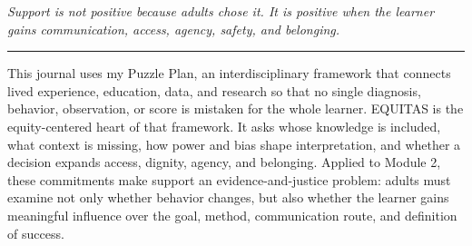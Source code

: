 \documentclass[11pt]{article}
\begin{document}
\begin{titlepage}
\vfill

\begin{center}
\begin{minipage}{0.92\textwidth}
\centering\itshape
Support is not positive because adults chose it. It is positive when the learner gains communication, access, agency, safety, and belonging.\\
{\color{PrimaryRed}\rule{4.4in}{0.8pt}}
\end{minipage}
\end{center}

\vfill

\begin{center}
\begin{minipage}{0.95\textwidth}
\small
This journal uses my Puzzle Plan, an interdisciplinary framework that connects lived experience, education, data, and research so that no single diagnosis, behavior, observation, or score is mistaken for the whole learner. EQUITAS is the equity-centered heart of that framework. It asks whose knowledge is included, what context is missing, how power and bias shape interpretation, and whether a decision expands access, dignity, agency, and belonging. Applied to Module 2, these commitments make support an evidence-and-justice problem: adults must examine not only whether behavior changes, but also whether the learner gains meaningful influence over the goal, method, communication route, and definition of success.
\end{minipage}
\end{center}

\restoregeometry
\end{titlepage}
\hypersetup{pageanchor=true}






\newpage
\small

\end{document}
